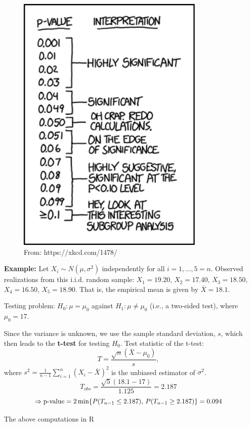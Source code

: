 \documentclass[]{book}
\theoremstyle{definition}
\theoremstyle{definition}
\theoremstyle{definition}
\theoremstyle{remark}
\begin{document}
\begin{figure}

{\centering \includegraphics[width=3.6in]{img/xkcd_p_values} 

}

\caption{From: https://xkcd.com/1478/}\label{fig:pvalueFig}
\end{figure}

\textbf{Example:}
Let \(X_i\sim N(\mu,\sigma^2)\) independently for all \(i=1,\dots,5=n\). Observed realizations from this i.i.d. random sample: \(X_1=19.20\), \(X_2=17.40\), \(X_3=18.50\), \(X_4=16.50\), \(X_5=18.90\). That is, the empirical mean is given by \(\bar X =18.1\).

Testing problem: \(H_0:\mu=\mu_0\) against \(H_1:\mu\ne\mu_0\) (i.e., a two-sided test), where \(\mu_0=17\).

Since the variance is unknown, we use the sample standard deviation, \(s\), which then leads to the \textbf{t-test} for testing \(H_0\). Test statistic of the t-test:
\[T=\frac{\sqrt{n}(\bar X-\mu_0)}{s},\]
where \(s^2=\frac{1}{n-1}\sum_{i=1}^n (X_i-\bar X)^2\) is the unbiased estimator of \(\sigma^2\).
\[T_{obs}=\frac{\sqrt{5}(18.1-17)}{1.125}=2.187\]
\[\Rightarrow \hbox{p-value}=2\min\{P(T_{n-1}\leq 2.187),\, P(T_{n-1}\geq 2.187)\}=0.094\]

The above computations in R
\end{document}
